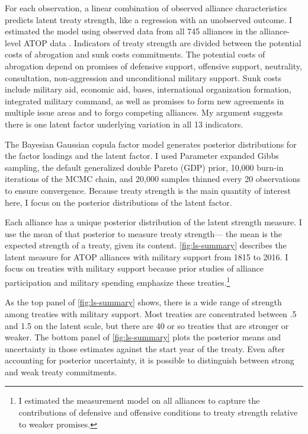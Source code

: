 \documentclass[12pt]{article}
\begin{document}
For each observation, a linear combination of observed alliance characteristics predicts latent treaty strength, like a regression with an unobserved outcome.  
I estimated the model using observed data from all 745 alliances in the alliance-level ATOP data \citep{Leedsetal2002}. 
Indicators of treaty strength are divided between the potential costs of abrogation and sunk costs commitments.
The potential costs of abrogation depend on promises of defensive support, offensive support, neutrality, consultation, non-aggression and unconditional military support. 
Sunk costs include military aid, economic aid, bases, international organization formation, integrated military command, as well as promises to form new agreements in multiple issue areas and to forgo competing alliances. 
My argument suggests there is one latent factor underlying variation in all 13 indicators.


The Bayesian Gaussian copula factor model generates posterior distributions for the factor loadings and the latent factor. 
I used Parameter expanded Gibbs sampling, the default generalized double Pareto (GDP) prior, 10,000 burn-in iterations of the MCMC chain, and 20,000 samples thinned every 20 observations to ensure convergence. 
Because treaty strength is the main quantity of interest here, I focus on the posterior distributions of the latent factor. 


Each alliance has a unique posterior distribution of the latent strength measure. 
I use the mean of that posterior to measure treaty strength--- the mean is the expected strength of a treaty, given its content. 
\autoref{fig:ls-summary} describes the latent measure for ATOP alliances  with military support from 1815 to 2016.
I focus on treaties with military support because prior studies of alliance participation and military spending emphasize these treaties.\footnote{
I estimated the measurement model on all alliances to capture the contributions of defensive and offensive conditions to treaty strength relative to weaker promises.
}


As the top panel of \autoref{fig:ls-summary} shows, there is a wide range of strength among treaties with military support. 
Most treaties are concentrated between .5 and 1.5 on the latent scale, but there are 40 or so treaties that are stronger or weaker. 
The bottom panel of \autoref{fig:ls-summary} plots the posterior means and uncertainty in those estimates against the start year of the treaty. 
Even after accounting for posterior uncertainty, it is possible to distinguish between strong and weak treaty commitments. 
\end{document}
